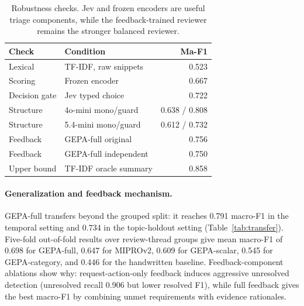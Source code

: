 \documentclass[11pt]{article}
\begin{document}
\begin{table}[t]
\centering
\scriptsize
\setlength{\tabcolsep}{3pt}
\begin{tabular}{llr}
\toprule
\textbf{Check} & \textbf{Condition} & \textbf{Ma-F1} \\
\midrule
Lexical & TF-IDF, raw snippets & 0.523 \\
Scoring & Frozen encoder & 0.667 \\
Decision gate & Jev typed choice & 0.722 \\
Structure & 4o-mini mono/guard & 0.638 / 0.808 \\
Structure & 5.4-mini mono/guard & 0.612 / 0.732 \\
Feedback & GEPA-full original & 0.756 \\
Feedback & GEPA-full independent & 0.750 \\
Upper bound & TF-IDF oracle summary & 0.858 \\
\bottomrule
\end{tabular}
\caption{Robustness checks. Jev and frozen encoders are useful triage components, while the feedback-trained reviewer remains the stronger balanced reviewer.}
\label{tab:robustness}
\end{table}

\paragraph{Generalization and feedback mechanism.}
GEPA-full transfers beyond the grouped split: it reaches 0.791 macro-F1 in the temporal setting and 0.734 in the topic-holdout setting (Table~\ref{tab:transfer}). Five-fold out-of-fold results over review-thread groups give mean macro-F1 of 0.698 for GEPA-full, 0.647 for MIPROv2, 0.609 for GEPA-scalar, 0.545 for GEPA-category, and 0.446 for the handwritten baseline. Feedback-component ablations show why: request-action-only feedback induces aggressive unresolved detection (unresolved recall 0.906 but lower resolved F1), while full feedback gives the best macro-F1 by combining unmet requirements with evidence rationales.
\end{document}
